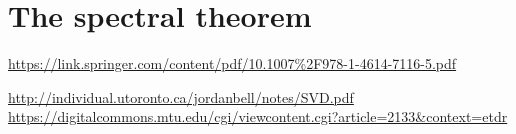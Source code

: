 \section{The spectral theorem}
\url{https://link.springer.com/content/pdf/10.1007%2F978-1-4614-7116-5.pdf}

\url{http://individual.utoronto.ca/jordanbell/notes/SVD.pdf}
\url{https://digitalcommons.mtu.edu/cgi/viewcontent.cgi?article=2133&context=etdr}



